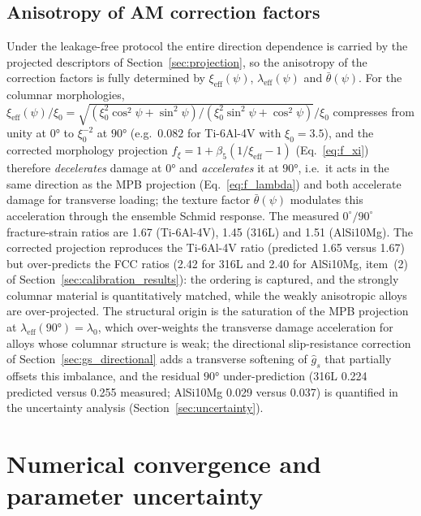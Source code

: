 \documentclass[12pt,a4paper,twocolumn]{article}
\begin{document}
\subsection{Anisotropy of AM correction factors}
\label{sec:aniso_factors}

Under the leakage-free protocol the entire direction dependence is carried by the projected descriptors of Section~\ref{sec:projection}, so the anisotropy of the correction factors is fully determined by $\xi_{\mathrm{eff}}(\psi)$, $\lambda_{\mathrm{eff}}(\psi)$ and $\bar\theta(\psi)$. For the columnar morphologies, $\xi_{\mathrm{eff}}(\psi)/\xi_0 = \sqrt{(\xi_0^2\cos^2\psi + \sin^2\psi)/(\xi_0^2\sin^2\psi + \cos^2\psi)}/\xi_0$ compresses from unity at $\ang{0}$ to $\xi_0^{-2}$ at $\ang{90}$ (e.g.\ $0.082$ for Ti-6Al-4V with $\xi_0 = 3.5$), and the corrected morphology projection $f_\xi = 1 + \beta_5(1/\xi_{\mathrm{eff}} - 1)$ (Eq.~\eqref{eq:f_xi}) therefore \emph{decelerates} damage at $\ang{0}$ and \emph{accelerates} it at $\ang{90}$, i.e.\ it acts in the same direction as the MPB projection (Eq.~\eqref{eq:f_lambda}) and both accelerate damage for transverse loading; the texture factor $\bar\theta(\psi)$ modulates this acceleration through the ensemble Schmid response. The measured $0^\circ/90^\circ$ fracture-strain ratios are 1.67 (Ti-6Al-4V), 1.45 (316L) and 1.51 (AlSi10Mg). The corrected projection reproduces the Ti-6Al-4V ratio (predicted 1.65 versus 1.67) but over-predicts the FCC ratios (2.42 for 316L and 2.40 for AlSi10Mg, item~(2) of Section~\ref{sec:calibration_results}): the ordering is captured, and the strongly columnar material is quantitatively matched, while the weakly anisotropic alloys are over-projected. The structural origin is the saturation of the MPB projection at $\lambda_{\mathrm{eff}}(\ang{90}) = \lambda_0$, which over-weights the transverse damage acceleration for alloys whose columnar structure is weak; the directional slip-resistance correction of Section~\ref{sec:gs_directional} adds a transverse softening of $\hat{g}_s$ that partially offsets this imbalance, and the residual $\ang{90}$ under-prediction (316L 0.224 predicted versus 0.255 measured; AlSi10Mg 0.029 versus 0.037) is quantified in the uncertainty analysis (Section~\ref{sec:uncertainty}).

\section{Numerical convergence and parameter uncertainty}
\label{sec:convergence}
\end{document}
